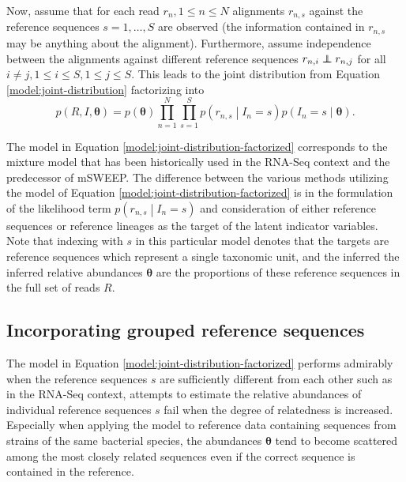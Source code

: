 \documentclass[officiallayout]{tktla}
\newcommand\indept{\protect\mathpalette{\protect\independenT}{\perp}}
\def\independenT#1#2{\mathrel{\rlap{$#1#2$}\mkern2mu{#1#2}}}
\begin{document}
Now, assume that for each read $r_{n}, 1 \leq n \leq N$ alignments
$r_{n, s}$ against the reference sequences $s = 1, \dots, S$ are
observed (the information contained in $r_{n, s}$ may be anything
about the alignment). Furthermore, assume independence between the
alignments against different reference sequences $r_{n, i} \indept
r_{n, j}$ for all $i \neq j, 1 \leq i \leq S, 1 \leq j \leq S$. This
leads to the joint distribution from Equation
\ref{model:joint-distribution} factorizing into
\begin{equation}
  \label{model:joint-distribution-factorized}
  p\left(R, I, \boldsymbol\theta\right) = p\left(\boldsymbol\theta\right)\prod_{n = 1}^{N} \prod_{s = 1}^{S} p\left(r_{n, s} \middle| I_{n} = s\right) p\left(I_{n} = s \middle| \boldsymbol\theta\right).
\end{equation}

The model in Equation \eqref{model:joint-distribution-factorized}
corresponds to the mixture model that has been historically used in
the RNA-Seq context and the predecessor of mSWEEP. The difference
between the various methods utilizing the model of Equation
\eqref{model:joint-distribution-factorized} is in the formulation of the
likelihood term $p\left(r_{n, s} \middle| I_{n} = s\right)$ and
consideration of either reference sequences or reference lineages as
the target of the latent indicator variables. Note that indexing with
$s$ in this particular model denotes that the targets are reference
sequences which represent a single taxonomic unit, and the inferred
the inferred relative abundances $\boldsymbol\theta$ are the
proportions of these reference sequences in the full set of reads $R$.

\subsection{Incorporating grouped reference sequences}

The model in Equation \eqref{model:joint-distribution-factorized}
performs admirably when the reference sequences $s$ are sufficiently
different from each other such as in the RNA-Seq context, attempts to
estimate the relative abundances of individual reference sequences $s$
fail when the degree of relatedness is increased. Especially when
applying the model to reference data containing sequences from strains
of the same bacterial species, the abundances $\boldsymbol\theta$ tend
to become scattered among the most closely related sequences
\textemdash{ } even if the correct sequence is contained in the
reference.
\end{document}
